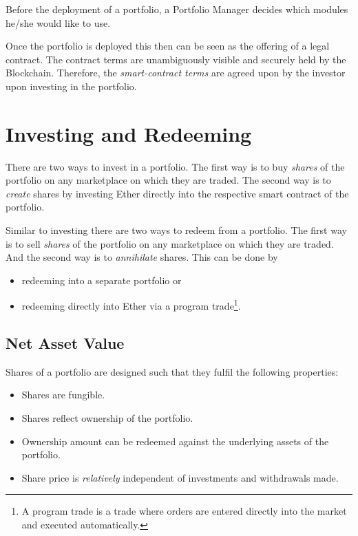 \documentclass[9pt,oneside]{amsart}
\theoremstyle{plain}
\begin{document}
\begin{multicols}{2}
Before the deployment of a portfolio, a Portfolio Manager decides which modules he/she would like to use.

Once the portfolio is deployed this then can be seen as the offering of a legal contract. The contract terms are unambiguously visible and securely held by the Blockchain. Therefore, the \textit{smart-contract terms} are agreed upon by the investor upon investing in the portfolio.
	
\section{Investing and Redeeming}\label{sec:investing}

There are two ways to invest in a portfolio. The first way is to buy \textit{shares} of the portfolio on any marketplace on which they are traded. The second way is to \textit{create} shares by investing Ether directly into the respective smart contract of the portfolio.

Similar to investing there are two ways to redeem from a portfolio. The first way is to sell \textit{shares} of the portfolio on any marketplace on which they are traded. And the second way is to \textit{annihilate} shares.
This can be done by
\begin{itemize}
	\item redeeming into a separate portfolio or
	\item redeeming directly into Ether via a program trade\footnote{A program trade is a trade where orders are entered directly into the market and executed automatically.}.
\end{itemize}

\subsection{Net Asset Value}\label{sub:defshares}

Shares of a portfolio are designed such that they fulfil the following properties:
\begin{itemize}
	\item Shares are fungible.
	\item Shares reflect ownership of the portfolio.
	\item Ownership amount can be redeemed against the underlying assets of the portfolio.
	\item Share price is \textit{relatively} independent of investments and withdrawals made.
\end{itemize}


\end{multicols}
\end{document}
